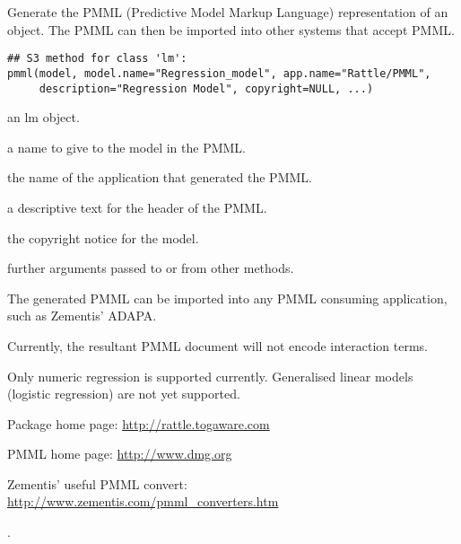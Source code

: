 \begin{Description}\relax
Generate the PMML (Predictive Model Markup Language) representation of
an  object. The PMML can then be imported into other systems
that accept PMML.
\end{Description}
\begin{Usage}
\begin{verbatim}
## S3 method for class 'lm':
pmml(model, model.name="Regression_model", app.name="Rattle/PMML",
     description="Regression Model", copyright=NULL, ...)
\end{verbatim}
\end{Usage}
\begin{Arguments}
\begin{ldescription}
\item[\code{model}] an lm object.
\item[\code{model.name}] a name to give to the model in the PMML.
\item[\code{app.name}] the name of the application that generated the PMML.
\item[\code{description}] a descriptive text for the header of the PMML.
\item[\code{copyright}] the copyright notice for the model.
\item[\code{...}] further arguments passed to or from other methods.
\end{ldescription}
\end{Arguments}
\begin{Details}\relax
The generated PMML can be imported into any PMML consuming
application, such as Zementis' ADAPA.

Currently, the resultant PMML document will not encode interaction
terms.

Only numeric regression is supported currently. Generalised linear
models (logistic regression) are not yet supported.
\end{Details}
\begin{Author}\relax
{}
\end{Author}
\begin{References}\relax
Package home page: \url{http://rattle.togaware.com}

PMML home page: \url{http://www.dmg.org}

Zementis' useful PMML convert: \url{http://www.zementis.com/pmml_converters.htm}
\end{References}
\begin{SeeAlso}\relax
{}.
\end{SeeAlso}

